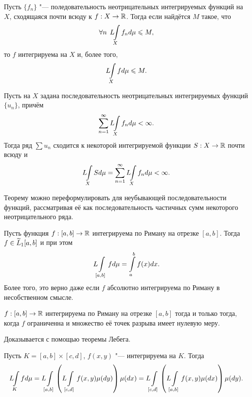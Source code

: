 \documentclass[main]{subfiles}
\begin{document}
\begin{theorem*}
  Пусть \( \{ f_n \} \) "--- поледовательность
  неотрицательных интегрируемых функций на \( X \),
  сходящаяся почти всюду к \( f : X \to \mathbb{R} \).
  Тогда если найдётся \( M \) такое, что
  \[
    \forall {n} \; \, L \! \! \int\limits_X f_n d \mu \leqslant M,
  \]
  то \( f \) интегрируема на \( X \)
  и, более того,
  \[
    L \! \! \int\limits_X f d \mu \leqslant M.
  \]
\end{theorem*}

\begin{theorem*}
  Пусть на \( X \) задана последовательность
  неотрицательных интегрируемых функций \( \{ u_n \} \),
  причём
  \[
    \sum_{n=1}^\infty L \! \! \int\limits_X f_n d \mu < \infty.
  \]
  Тогда ряд \( \sum u_n \) сходится к некоторой
  интегрируемой функции \( S : X \to \mathbb{R} \)
  почти всюду и
  \[
    L \! \! \int\limits_X S d \mu = \sum_{n=1}^\infty L \! \! \int\limits_X f_n d \mu < \infty.
  \]
\end{theorem*}
\begin{remark}
  Теорему можно переформулировать
  для неубывающей последовательности функций,
  рассматривая её как последовательность
  частичных сумм некоторого неотрицательного ряда.
\end{remark}

\begin{theorem*}
  Пусть функция \( f : [a, b] \to \mathbb{R} \)
  интегрируема по Риману на отрезке \( [a, b] \).
  Тогда \( f \in \widetilde{L}_1[a, b] \) и при этом
  \[
    L \! \! \int\limits_{[a,b]} f d \mu = \int\limits_a^b f(x) dx.
  \]
  Более того, это верно даже если
  \( f \) абсолютно интегрируема по Риману в несобственном смысле.
\end{theorem*}

\begin{theorem*}
  \( f : [a, b] \to \mathbb{R} \) интегрируема по Риману
  на отрезке \( [a, b] \) тогда и только тогда, когда
  \( f \) ограниченна и множество её точек разрыва
  имеет нулевую меру.
\end{theorem*}

\begin{remark}
  Доказывается с помощью теоремы Лебега.
\end{remark}

\begin{theorem*}[Фубини]
  Пусть \( K = [a, b] \times [c, d] \),
  \( f(x, y) \) "--- интегрируема на \( K \).
  Тогда
  \[
    \intl_K f d \mu
    = \intl_{[a, b]} \left( \intl_{[c, d]} f(x, y) \mu(dy) \right) \mu(dx)
    = \intl_{[c, d]} \left( \intl_{[a, b]} f(x, y) \mu(dx) \right) \mu(dy).
  \]
\end{theorem*}
\end{document}
